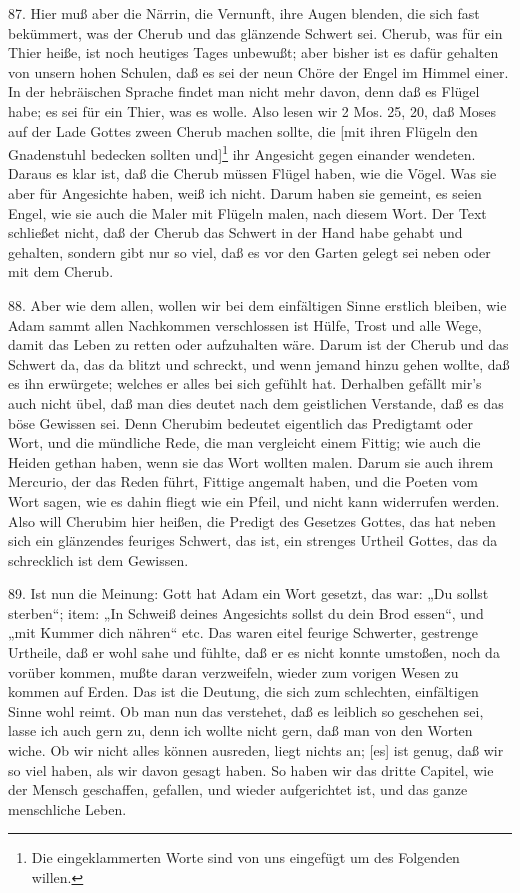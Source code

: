 87. Hier muß aber die Närrin, die Vernunft, ihre Augen blenden, die sich fast bekümmert, was der Cherub und das glänzende Schwert sei. Cherub, was für ein Thier heiße, ist noch heutiges Tages unbewußt; aber bisher ist es dafür gehalten von unsern hohen Schulen, daß es sei der neun Chöre der Engel im Himmel einer. In der hebräischen Sprache findet man nicht mehr davon, denn daß es Flügel habe; es sei für ein Thier, was es wolle. Also lesen wir 2 Mos. 25, 20, daß Moses auf der Lade Gottes zween Cherub machen sollte, die [mit ihren Flügeln den Gnadenstuhl bedecken sollten und]\footnote{Die eingeklammerten Worte sind von uns eingefügt um des Folgenden willen.} ihr Angesicht gegen einander wendeten. Daraus es klar ist, daß die Cherub müssen Flügel haben, wie die Vögel. Was sie aber für Angesichte haben, weiß ich nicht. Darum haben sie gemeint, es seien Engel, wie sie auch die Maler mit Flügeln malen, nach diesem Wort. Der Text schließet nicht, daß der Cherub das Schwert in der Hand habe gehabt und gehalten, sondern gibt nur so viel, daß es vor den Garten gelegt sei neben oder mit dem Cherub.

88. Aber wie dem allen, wollen wir bei dem einfältigen Sinne erstlich bleiben, wie Adam sammt allen Nachkommen verschlossen ist Hülfe, Trost und alle Wege, damit das Leben zu retten oder aufzuhalten wäre. Darum ist der Cherub und das Schwert da, das da blitzt und schreckt, und wenn jemand hinzu gehen wollte, daß es ihn erwürgete; welches er alles bei sich gefühlt hat. Derhalben gefällt mir’s auch nicht übel, daß man dies deutet nach dem geistlichen Verstande, daß es das böse Gewissen sei. Denn Cherubim bedeutet eigentlich das Predigtamt oder Wort, und die mündliche Rede, die man vergleicht einem Fittig; wie auch die Heiden gethan haben, wenn sie das Wort wollten malen. Darum sie auch ihrem Mercurio, der das Reden führt, Fittige angemalt haben, und die Poeten vom Wort sagen, wie es dahin fliegt wie ein Pfeil, und nicht kann widerrufen werden. Also will Cherubim hier heißen, die Predigt des Gesetzes Gottes, das hat neben sich ein glänzendes feuriges Schwert, das ist, ein strenges Urtheil Gottes, das da schrecklich ist dem Gewissen.

89. Ist nun die Meinung: Gott hat Adam ein Wort gesetzt, das war: „Du sollst sterben“; item: „In Schweiß deines Angesichts sollst du dein Brod essen“, und „mit Kummer dich nähren“ etc. Das waren eitel feurige Schwerter, gestrenge Urtheile, daß er wohl sahe und fühlte, daß er es nicht konnte umstoßen, noch da vorüber kommen, mußte daran verzweifeln, wieder zum vorigen Wesen zu kommen auf Erden. Das ist die Deutung, die sich zum schlechten, einfältigen Sinne wohl reimt. Ob man nun das verstehet, daß es leiblich so geschehen sei, lasse ich auch gern zu, denn ich wollte nicht gern, daß man von den Worten wiche. Ob wir nicht alles können ausreden, liegt nichts an; [es] ist genug, daß wir so viel haben, als wir davon gesagt haben. So haben wir das dritte Capitel, wie der Mensch geschaffen, gefallen, und wieder aufgerichtet ist, und das ganze menschliche Leben.

